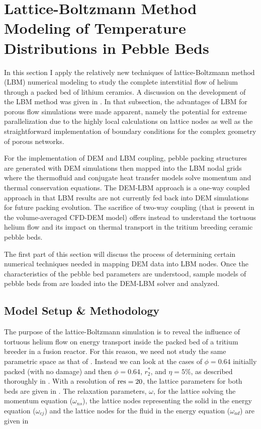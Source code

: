 \section{Lattice-Boltzmann Method Modeling of Temperature Distributions in Pebble Beds}\label{sec:lbm-studies}
In this section I apply the relatively new techniques of lattice-Boltzmann method (LBM) numerical modeling to study the complete interstitial flow of helium through a packed bed of lithium ceramics. A discussion on the development of the LBM method was given in . In that subsection, the advantages of LBM for porous flow simulations were made apparent, namely the potential for extreme parallelization due to the highly local calculations on lattice nodes as well as the straightforward implementation of boundary conditions for the complex geometry of porous networks.

For the implementation of DEM and LBM coupling, pebble packing structures are generated with DEM simulations then mapped into the LBM nodal grids where the thermofluid and conjugate heat transfer models solve momentum and thermal conservation equations. The DEM-LBM approach is a one-way coupled approach in that LBM results are not currently fed back into DEM simulations for future packing evolution. The sacrifice of two-way coupling (that is present in the volume-averaged CFD-DEM model) offers instead to understand the tortuous helium flow and its impact on thermal transport in the tritium breeding ceramic pebble beds.

The first part of this section will discuss the process of determining certain numerical techniques needed in mapping DEM data into LBM nodes. Once the characteristics of the pebble bed parameters are understood, sample models of pebble beds from  are loaded into the DEM-LBM solver and analyzed.







\FloatBarrier

\subsection{Model Setup \& Methodology}
The purpose of the lattice-Boltzmann simulation is to reveal the influence of tortuous helium flow on energy transport inside the packed bed of a tritium breeder in a fusion reactor. For this reason, we need not study the same parametric space as that of . Instead we can look at the cases of $\phi = 0.64$ initially packed (with no damage) and then $\phi = 0.64$, $r_2^*$, and $\eta = 5\%$, as described thoroughly in . With a resolution of $\text{res} = 20$, the lattice parameters for both beds are given in . The relaxation parameters, $\omega$, for the lattice solving the momentum equation ($\omega_{ns}$), the lattice nodes representing the solid in the energy equation ($\omega_{cj}$) and the lattice nodes for the fluid in the energy equation ($\omega_{ad}$) are given in 

